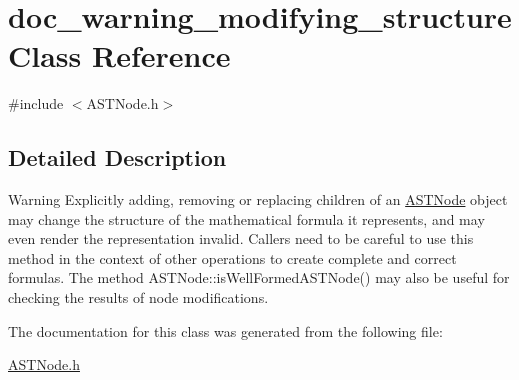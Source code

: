 \hypertarget{classdoc__warning__modifying__structure}{}\section{doc\+\_\+warning\+\_\+modifying\+\_\+structure Class Reference}
\label{classdoc__warning__modifying__structure}


{\ttfamily \#include $<$A\+S\+T\+Node.\+h$>$}



\subsection{Detailed Description}
\begin{DoxyWarning}{Warning}
Explicitly adding, removing or replacing children of an \hyperlink{class_a_s_t_node}{A\+S\+T\+Node} object may change the structure of the mathematical formula it represents, and may even render the representation invalid. Callers need to be careful to use this method in the context of other operations to create complete and correct formulas. The method A\+S\+T\+Node\+::is\+Well\+Formed\+A\+S\+T\+Node() may also be useful for checking the results of node modifications. 
\end{DoxyWarning}


The documentation for this class was generated from the following file\+:\begin{DoxyCompactItemize}
\item 
\hyperlink{_a_s_t_node_8h}{A\+S\+T\+Node.\+h}\end{DoxyCompactItemize}
